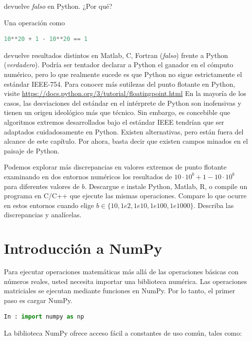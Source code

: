 \noindent devuelve \textit{falso} en Python. ¿Por qué? \QA

Una operación como

\begin{lstlisting}[language=Python]
	10**20 + 1 - 10**20 == 1
\end{lstlisting}

\noindent devuelve resultados distintos en Matlab, C, Fortran (\textit{falso}) frente a Python (\textit{verdadero}). Podría ser tentador declarar a Python el ganador en el cómputo numérico, pero lo que realmente sucede es que Python no sigue estrictamente el estándar IEEE-754. Para conocer más sutilezas del punto flotante en Python, visite \url{https://docs.python.org/3/tutorial/floatingpoint.html} En la mayoría de los casos, las desviaciones del estándar en el intérprete de Python son inofensivas y tienen un origen ideológico más que técnico. Sin embargo, es concebible que algoritmos extremos desarrollados bajo el estándar IEEE tendrían que ser adaptados cuidadosamente en Python. Existen alternativas, pero están fuera del alcance de este capítulo. Por ahora, basta decir que existen campos minados en el paisaje de Python.

Podemos explorar más discrepancias en valores extremos de punto flotante examinando en dos entornos numéricos los resultados de $10\cdot 10^b + 1 - 10\cdot 10^b$ para diferentes valores de $b$. Descargue e instale Python, Matlab, R, o compile un programa en C/C++ que ejecute las mismas operaciones. Compare lo que ocurre en estos entornos cuando elige $b \in \{10, 1e2, 1e10, 1e100, 1e1000\}$. Describa las discrepancias y analícelas. \QA



\section{Introducción a NumPy}

Para ejecutar operaciones matemáticas más allá de las operaciones básicas con números reales, usted necesita importar una biblioteca numérica. Las operaciones matriciales se ejecutan mediante funciones en NumPy. Por lo tanto, el primer paso es cargar NumPy.

\begin{lstlisting}[language=Python]
In : import numpy as np
\end{lstlisting}

La biblioteca NumPy ofrece acceso fácil a constantes de uso común, tales como:

